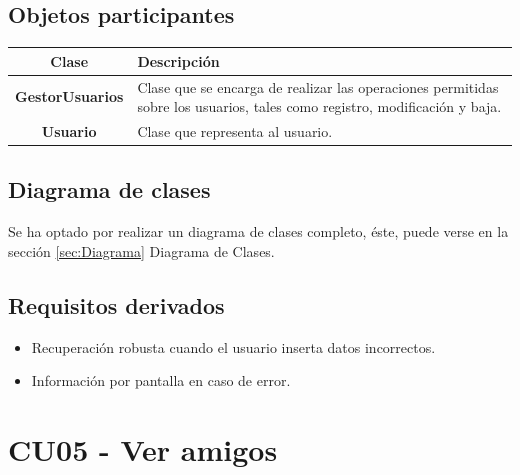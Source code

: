 \documentclass[12pt, a4paper, titlepage]{article}
\begin{document}
\subsection{Objetos participantes}
\begin{center}

\begin{tabular}{|c|p{14cm}|}
	\hline
	\textbf{Clase} & \textbf{Descripción}\\ \hline
	\textbf{GestorUsuarios} &  Clase que se encarga de realizar las operaciones permitidas sobre los usuarios, tales como registro, modificación y baja.\\ \hline
	\textbf{Usuario} & Clase que representa al usuario. \\ \hline
\end{tabular}

\end{center}


\subsection{Diagrama de clases}
Se ha optado por realizar un diagrama de clases completo, éste, puede verse en la sección \ref{sec:Diagrama} Diagrama de Clases.
\subsection{Requisitos derivados}

\begin{itemize}
	\item Recuperación robusta cuando el usuario inserta datos incorrectos.
	\item Información por pantalla en caso de error.
\end{itemize}

\section{CU05 - Ver amigos}
\end{document}
